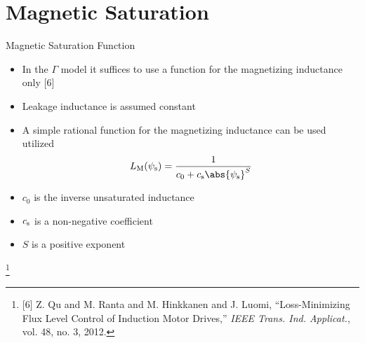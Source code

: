 \documentclass[11pt,aspectratio=169]{beamer}
\begin{document}
\section{Magnetic Saturation}
\begin{frame}{Magnetic Saturation Function}
\begin{itemize}
 \item In the $\Gamma$ model it suffices to use a function for the magnetizing inductance only [6]
\item Leakage inductance is assumed constant 
\item A simple rational function for the magnetizing inductance can be used utilized
    \begin{align*}
\LM(\psi_\scr{s})=\frac{1}{c_{0}+c_\scr{s}\abs{\psi_\scr{s}}^{S}}
\end{align*}
\item $c_{0}$ is the inverse unsaturated inductance
\item $c_{\text{s}}$ is a non-negative coefficient 
\item $S$ is a positive exponent
\end{itemize}
\footnote{[6] Z. Qu and M. Ranta and M. Hinkkanen and J. Luomi, ``Loss-Minimizing Flux Level Control of Induction Motor Drives,'' \emph{IEEE Trans. Ind. Applicat.}, vol. 48, no. 3, 2012.}
\end{frame}
\end{document}
